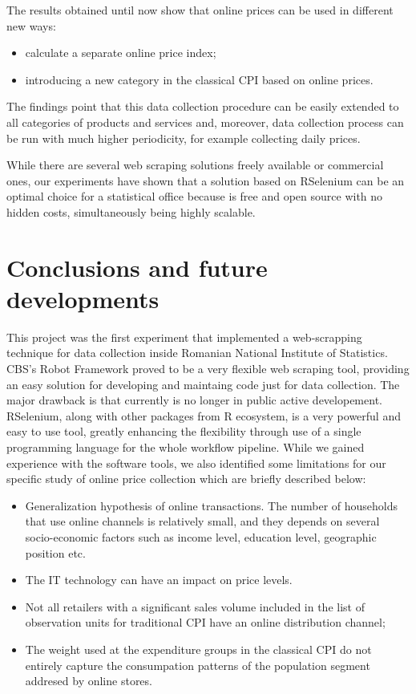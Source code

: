 \documentclass[]{article}
\begin{document}
The results obtained until now show that online prices can be used in different new ways:

\begin{itemize}
	\item calculate a separate online price index;
	\item introducing a new category in the classical CPI based on online prices.
\end{itemize}

The findings point that this data collection procedure can be easily extended to all categories of products and services and, moreover, data collection process
can be run with much higher periodicity, for example collecting daily prices.

While there are several web scraping solutions freely available or commercial ones, our experiments have shown that a solution based on RSelenium can be an optimal choice for a statistical office because is free and open source with no hidden costs, simultaneously being highly scalable.


\section{Conclusions and future developments}\label{conclusions}

This project was the first experiment that implemented a web-scrapping technique for data collection 
inside Romanian National Institute of Statistics. CBS's Robot Framework proved to be a very flexible web scraping tool, providing an easy solution
for developing and maintaing code just for data collection. The major drawback is that currently is no longer
in public active developement. RSelenium, along with other packages from R ecosystem, is a very powerful and easy to 
use tool, greatly enhancing the flexibility through use of a single programming language for the whole workflow pipeline.  
While we gained experience with the software tools, we also 
identified some limitations for our specific study of online price collection which are briefly described below:
\begin{itemize}
\item Generalization hypothesis of online transactions. The number of households that use online channels is relatively small, and they depends on several socio-economic factors such as income level, education level, geographic position etc.
\item The IT technology can have an impact on price levels.
\item Not all retailers with a significant sales volume included in the list of observation 
units for traditional CPI have an online distribution channel;
\item  The weight used at the expenditure groups in the classical CPI do not entirely capture the consumpation patterns of the population segment addresed by online stores. 
\end{itemize}
\end{document}
